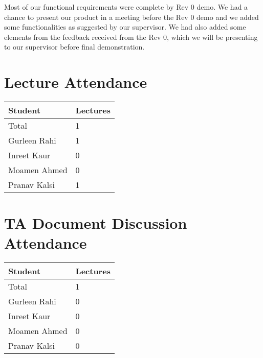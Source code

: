 \documentclass{article}
\begin{document}
Most of our functional requirements were complete by Rev 0 demo. We had a chance to present our product in a meeting before the Rev 0 demo and we added some functionalities as suggested by our supervisor. We had also added some elements from the feedback received from the Rev 0, which we will be presenting to our supervisor before final demonstration. 

\section{Lecture Attendance}


\begin{table}[H]
\centering
\begin{tabular}{ll}
\toprule
\textbf{Student} & \textbf{Lectures}\\
\midrule
Total & 1\\
Gurleen Rahi & 1 \\
Inreet Kaur & 0 \\
Moamen Ahmed & 0 \\
Pranav Kalsi & 1 \\
\bottomrule
\end{tabular}
\end{table}


\section{TA Document Discussion Attendance}


\begin{table}[H]
\centering
\begin{tabular}{ll}
\toprule
\textbf{Student} & \textbf{Lectures}\\
\midrule
Total & 1\\
Gurleen Rahi & 0 \\
Inreet Kaur & 0 \\
Moamen Ahmed & 0 \\
Pranav Kalsi & 0 \\
\bottomrule
\end{tabular}
\end{table}
\end{document}
